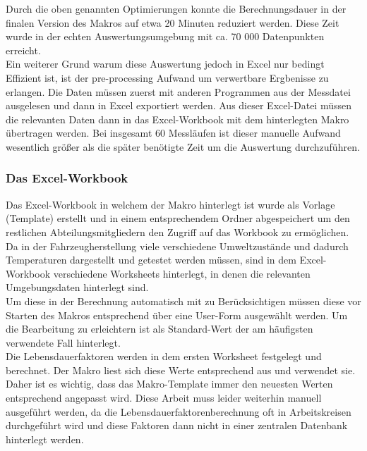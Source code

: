 Durch die oben genannten Optimierungen konnte die Berechnungsdauer in der finalen Version des Makros auf etwa 20 Minuten reduziert werden. Diese Zeit wurde in der echten Auswertungsumgebung mit ca. 70 000 Datenpunkten erreicht.\\

Ein weiterer Grund warum diese Auswertung jedoch in Excel nur bedingt Effizient ist, ist der pre-processing Aufwand um verwertbare Ergbenisse zu erlangen. Die Daten müssen zuerst mit anderen Programmen aus der Messdatei ausgelesen und dann in Excel exportiert werden. Aus dieser Excel-Datei müssen die relevanten Daten dann in das Excel-Workbook mit dem hinterlegten Makro übertragen werden. Bei insgesamt 60 Messläufen ist dieser manuelle Aufwand wesentlich größer als die später benötigte Zeit um die Auswertung durchzuführen.\\

\subsubsection{Das Excel-Workbook}
\label{Workbook}

Das Excel-Workbook in welchem der Makro hinterlegt ist wurde als Vorlage (Template) erstellt und in einem entsprechendem Ordner abgespeichert um den restlichen Abteilungsmitgliedern den Zugriff auf das Workbook zu ermöglichen.\\

Da in der Fahrzeugherstellung viele verschiedene Umweltzustände und dadurch Temperaturen dargestellt und getestet werden müssen, sind in dem Excel-Workbook verschiedene Worksheets hinterlegt, in denen die relevanten Umgebungsdaten hinterlegt sind. \\
Um diese in der Berechnung automatisch mit zu Berücksichtigen müssen diese vor Starten des Makros entsprechend über eine User-Form ausgewählt werden. Um die Bearbeitung zu erleichtern ist als Standard-Wert der am häufigsten verwendete Fall hinterlegt. \\

Die Lebensdauerfaktoren werden in dem ersten Worksheet festgelegt und berechnet. Der Makro liest sich diese Werte entsprechend aus und verwendet sie. Daher ist es wichtig, dass das Makro-Template immer den neuesten Werten entsprechend angepasst wird. Diese Arbeit muss leider weiterhin manuell ausgeführt werden, da die Lebensdauerfaktorenberechnung oft in Arbeitskreisen durchgeführt wird und diese Faktoren dann nicht in einer zentralen Datenbank hinterlegt werden. \\

